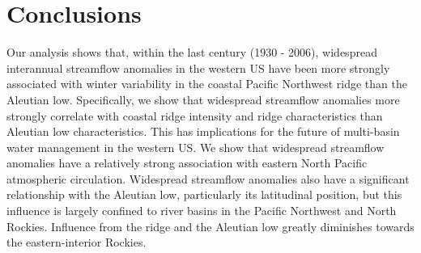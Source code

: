 \documentclass[final, double]{ua-thesis}
\begin{document}




\section{Conclusions}


Our analysis shows that, within the last century (1930 - 2006), widespread interannual streamflow anomalies in the western US have been more strongly associated with winter variability in the coastal Pacific Northwest ridge than the Aleutian low. Specifically, we show that widespread streamflow anomalies more strongly correlate with coastal ridge intensity and ridge characteristics than Aleutian low characteristics. This has implications for the future of multi-basin water management in the western US. We show that widespread streamflow anomalies have a relatively strong association with eastern North Pacific atmospheric circulation. Widespread streamflow anomalies also have a significant relationship with the Aleutian low, particularly its latitudinal position, but this influence is largely confined to river basins in the Pacific Northwest and North Rockies. Influence from the ridge and the Aleutian low greatly diminishes towards the eastern-interior Rockies.
\end{document}
